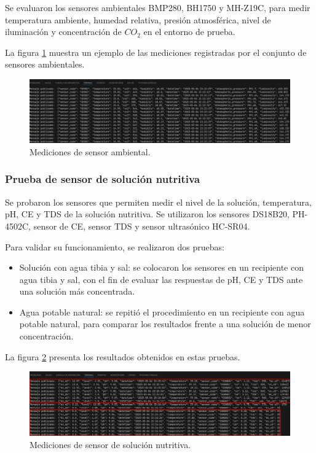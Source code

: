Se evaluaron los sensores ambientales BMP280, BH1750 y MH-Z19C, para medir
temperatura ambiente, humedad relativa, presión atmosférica, nivel de
iluminación y concentración de $CO_2$ en el entorno de prueba.

La figura \ref{fig:medicion_sensor_ambiental} muestra un ejemplo de las
mediciones registradas por el conjunto de sensores ambientales.

\begin{figure}[H]
    \centering
    \includegraphics[width=\textwidth]{Images/51_sensor_ambiental.png}
    \caption[Mediciones de sensor ambiental]{Mediciones de sensor ambiental.}
    \label{fig:medicion_sensor_ambiental}
\end{figure}

\subsubsection{Prueba de sensor de solución nutritiva}

Se probaron los sensores que permiten medir el nivel de la solución,
temperatura, pH, CE y TDS de la solución nutritiva. Se utilizaron los sensores
DS18B20, PH-4502C, sensor de CE, sensor TDS y sensor ultrasónico HC-SR04.

Para validar su funcionamiento, se realizaron dos pruebas:

\begin{itemize}
    \item Solución con agua tibia y sal: se colocaron los sensores en un recipiente con
          agua tibia y sal, con el fin de evaluar las respuestas de pH, CE y TDS ante una
          solución más concentrada.
    \item Agua potable natural: se repitió el procedimiento en un recipiente con agua
          potable natural, para comparar los resultados frente a una solución de menor
          concentración.
\end{itemize}

La figura \ref{fig:medicion_sensor_solucion} presenta los resultados obtenidos
en estas pruebas.

\begin{figure}[H]
    \centering
    \includegraphics[width=\textwidth]{Images/52_sensor_solucion_nutritiva.png}
    \caption[Mediciones de sensor de solución nutritiva]{Mediciones de sensor de solución nutritiva.}
    \label{fig:medicion_sensor_solucion}
\end{figure}

